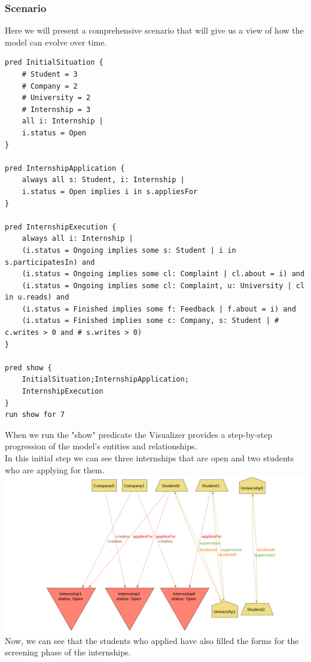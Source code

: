 \documentclass[11pt,twoside]{article}
\begin{document}
	\subsubsection{Scenario}
Here we will present a comprehensive scenario that will give us a view of how the model can evolve over time.
{\small
\begin{verbatim}
pred InitialSituation {
    # Student = 3
    # Company = 2
    # University = 2
    # Internship = 3
    all i: Internship |
    i.status = Open
}

pred InternshipApplication {
    always all s: Student, i: Internship |
    i.status = Open implies i in s.appliesFor
}

pred InternshipExecution {
    always all i: Internship |
    (i.status = Ongoing implies some s: Student | i in s.participatesIn) and
    (i.status = Ongoing implies some cl: Complaint | cl.about = i) and
    (i.status = Ongoing implies some cl: Complaint, u: University | cl in u.reads) and
    (i.status = Finished implies some f: Feedback | f.about = i) and
    (i.status = Finished implies some c: Company, s: Student | # c.writes > 0 and # s.writes > 0)
}

pred show {
    InitialSituation;InternshipApplication;
    InternshipExecution
}
run show for 7
\end{verbatim}
}
When we run the "show" predicate the Visualizer provides a step-by-step progression of the model's entities and relationships. \\
In this initial step we can see three internships that are open and two students who are applying for them. \\
\includegraphics[width=\textwidth]{Images/Scene_step0}
\newpage
Now, we can see that the students who applied have also filled the forms for the screening phase of the internships. \\
\end{document}
